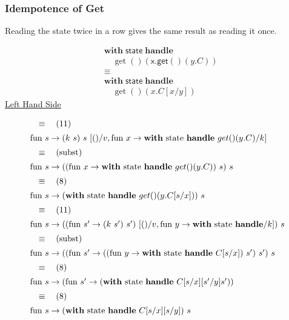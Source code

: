 \documentclass[logo,bsc,singlespacing,parskip]{infthesis}
\begin{document}
\subsubsection*{Idempotence of Get}
Reading the state twice in a row gives the same result as reading it once.


\[
\begin{aligned}
    &\mathsf{\textbf{with}} \; \mathsf{state} \; \mathsf{\textbf{handle}} \\
    &\quad \operatorname{get}() \left( \mathsf{x.get}() \left( y.C \right) \right) \\
    &\equiv \\
    &\mathsf{\textbf{with}} \; \mathsf{state} \; \mathsf{\textbf{handle}} \\
    &\quad \operatorname{get}() \left( x.C[x/y] \right)
\end{aligned}
\]
\underline{Left Hand Side}

\[ 
\begin{array}{l}
\quad\equiv\quad (11) \\[5pt]
\text{fun } s \rightarrow (k\ s)\ s\ [()/v, \text{fun } x \rightarrow \text{\textbf{with} state \textbf{handle} } get()(y.C)/k] \\[5pt]
\quad\equiv\quad (\text{subst}) \\[5pt]
\text{fun } s \rightarrow ((\text{fun } x \rightarrow \text{\textbf{with} state \textbf{handle} } get()(y.C))\ s)\ s \\[5pt]
\quad\equiv\quad (8) \\[5pt]
\text{fun } s \rightarrow (\text{\textbf{with} state \textbf{handle} } get()(y.C[s/x]))\ s \\[5pt]
\quad\equiv\quad (11) \\[5pt]
\text{fun } s \rightarrow ((\text{fun } s'\rightarrow (k\ s')\ s')\ [()/v, \text{fun } y\rightarrow \text{\textbf{with} state \textbf{handle}}/k])\ s \\[5pt]
\quad\equiv\quad (\text{subst}) \\[5pt]
\text{fun } s \rightarrow ((\text{fun } s' \rightarrow (( \text{fun } y \rightarrow \text{\textbf{with} state \textbf{handle} } C[s/x])\ s')\ s')\ s \\[5pt]
\quad\equiv\quad (8) \\[5pt]
\text{fun } s \rightarrow (\text{fun } s' \rightarrow (\text{\textbf{with} state \textbf{handle} } C[s/x][s'/y]s')) \\[5pt]
\quad\equiv\quad (8) \\[5pt]
\text{fun } s \rightarrow (\text{\textbf{with} state \textbf{handle} } C[s/x][s/y])\ s
\end{array}
\]
\end{document}
